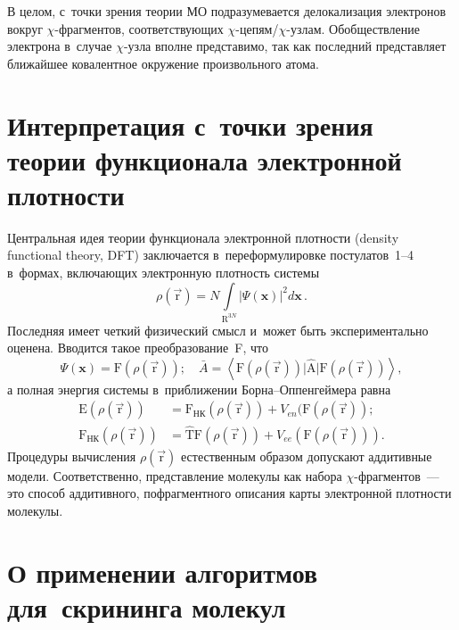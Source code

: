 \begin{multicols}{2}
    В целом, с~точки зрения тео\-рии МО подразумевается делокализация 
электронов вокруг \mbox{$\chi$-фраг}\-мен\-тов, соответствующих  
$\chi$-це\-пям/$\chi$-уз\-лам. Обобществление электрона в~случае $\chi$-уз\-ла 
вполне \mbox{представимо}, так как последний представляет ближайшее ковалентное 
окружение произвольного атома. 

\section{Интерпретация с~точки зрения теории функционала 
электронной плотности}
    
Центральная идея теории функционала электронной плотности (density 
functional theory, DFT) заключается в~переформулировке постулатов~1--4 
в~формах, включающих электронную плот\-ность сис\-те\-мы 
$$
\rho\left(\vec{\mathrm{r}}\right)= N\int\limits_{\mathrm{R}^{3N}} \vert 
\Psi(\mathbf{x})\vert^2d\mathbf{x}\,.
$$ 
Последняя имеет четкий физический смысл 
и~может быть экспериментально оценена. Вводится такое преобразование~F, 
что 
$$
\Psi(\mathbf{x})= \mathrm{F}\left(\rho(\vec{\mathrm{r}})\right); \quad
\bar{{A}}= \left\langle \mathrm{F}\left(\rho(\vec{\mathrm{r}})\right)\vert 
\hat{\mathrm{A}}\vert \mathrm{F}\left(\rho(\vec{\mathrm{r}})\right)\right\rangle,
$$
 а полная 
энергия системы в~приближении  
Бор\-на--Оп\-пен\-гей\-ме\-ра равна 
\begin{align*}
\mathrm{E}\left(\rho(\vec{\mathrm{r}})\right)&= 
\mathrm{F}_{\mathrm{НК}}\left(\rho(\vec{\mathrm{r}})\right)+ 
V_{en}(\mathrm{F}\left(\rho(\vec{\mathrm{r}})\right);\\ 
\mathrm{F}_{\mathrm{НК}}\left(\rho(\vec{\mathrm{r}})\right)&= \hat{\mathrm{T}} 
\mathrm{F}\left(\rho(\vec{\mathrm{r}})\right)+ 
V_{ee}\left(\mathrm{F}\left(\rho(\vec{\mathrm{r}})\right)\right).
\end{align*}
 Процедуры вычисления 
$\rho(\vec{\mathrm{r}})$ естественным образом допускают аддитивные модели. 
Соответственно, представление молекулы как набора $\chi$-фраг\-мен\-тов~--- 
это способ аддитивного, пофрагментного описания карты электронной 
плотности молекулы. 

\section{О применении алгоритмов для~скрининга молекул}


\end{multicols}
